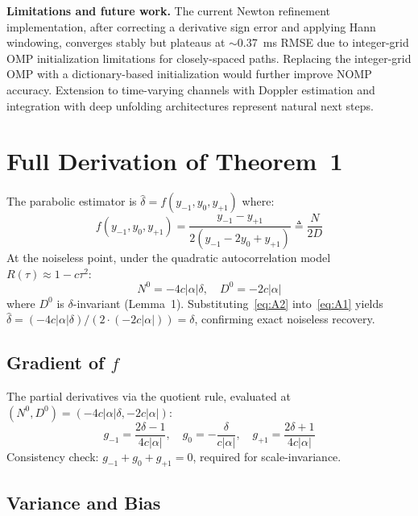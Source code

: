 \documentclass[a4paper,fleqn]{cas-dc}
\begin{document}
\textbf{Limitations and future work.} The current Newton refinement implementation, after correcting a derivative sign error and applying Hann windowing, converges stably but plateaus at $\sim$0.37~ms RMSE due to integer-grid OMP initialization limitations for closely-spaced paths. Replacing the integer-grid OMP with a dictionary-based initialization would further improve NOMP accuracy. Extension to time-varying channels with Doppler estimation and integration with deep unfolding architectures represent natural next steps.

\appendix
\section{Full Derivation of Theorem~1}
\label{app:theorem1}

The parabolic estimator is $\hat{\delta} = f(y_{-1}, y_0, y_{+1})$ where:
\begin{equation}
f(y_{-1}, y_0, y_{+1}) = \frac{y_{-1} - y_{+1}}{2(y_{-1} - 2y_0 + y_{+1})} \triangleq \frac{N}{2D}
\label{eq:A1}
\end{equation}
At the noiseless point, under the quadratic autocorrelation model $R(\tau) \approx 1 - c\tau^2$:
\begin{equation}
N^0 = -4c|\alpha|\delta, \quad D^0 = -2c|\alpha|
\label{eq:A2}
\end{equation}
where $D^0$ is $\delta$-invariant (Lemma~1). Substituting~\eqref{eq:A2} into~\eqref{eq:A1} yields $\hat{\delta} = (-4c|\alpha|\delta) / (2 \cdot (-2c|\alpha|)) = \delta$, confirming exact noiseless recovery.

\subsection{Gradient of \texorpdfstring{$f$}{f}}

The partial derivatives via the quotient rule, evaluated at $(N^0, D^0) = (-4c|\alpha|\delta, -2c|\alpha|)$:
\begin{equation}
g_{-1} = \frac{2\delta - 1}{4c|\alpha|}, \quad
g_0    = -\frac{\delta}{c|\alpha|}, \quad
g_{+1} = \frac{2\delta + 1}{4c|\alpha|}
\label{eq:A4}
\end{equation}
Consistency check: $g_{-1} + g_0 + g_{+1} = 0$, required for scale-invariance.

\subsection{Variance and Bias}
\end{document}
